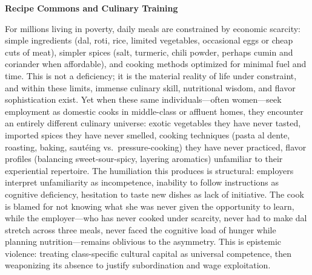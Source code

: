 \textbf{Recipe Commons and Culinary Training}

For millions living in poverty, daily meals are constrained by economic
scarcity: simple ingredients (dal, roti, rice, limited vegetables,
occasional eggs or cheap cuts of meat), simpler spices (salt, turmeric,
chili powder, perhaps cumin and coriander when affordable), and cooking
methods optimized for minimal fuel and time. This is not a deficiency;
it is the material reality of life under constraint, and within these
limits, immense culinary skill, nutritional wisdom, and flavor
sophistication exist. Yet when these same individuals---often
women---seek employment as domestic cooks in middle-class or affluent
homes, they encounter an entirely different culinary universe: exotic
vegetables they have never tasted, imported spices they have never
smelled, cooking techniques (pasta al dente, roasting, baking, sautéing
vs.~pressure-cooking) they have never practiced, flavor profiles
(balancing sweet-sour-spicy, layering aromatics) unfamiliar to their
experiential repertoire. The humiliation this produces is structural:
employers interpret unfamiliarity as incompetence, inability to follow
instructions as cognitive deficiency, hesitation to taste new dishes as
lack of initiative. The cook is blamed for not knowing what she was
never given the opportunity to learn, while the employer---who has never
cooked under scarcity, never had to make dal stretch across three meals,
never faced the cognitive load of hunger while planning
nutrition---remains oblivious to the asymmetry. This is epistemic
violence: treating class-specific cultural capital as universal
competence, then weaponizing its absence to justify subordination and
wage exploitation.

